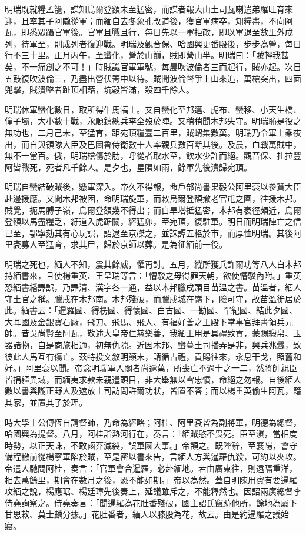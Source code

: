 \begin{pinyinscope}
明瑞既就糧孟籠，諜知烏爾登額未至猛密，而諜者報大山土司瓦喇遣弟羅旺育來迎，且率其子阿隴從軍；而緬自去冬象孔改道後，獲官軍病卒，知糧盡，不向阿瓦，即悉眾躡官軍後。官軍且戰且行，每日先以一軍拒敵，即以軍退至數里外成列，待軍至，則成列者復迎戰。明瑞及觀音保、哈國興更番殿後，步步為營，每日行不三十里。正月丙午，至蠻化，營於山巔，賊即營山半。明瑞曰：「賊輕我甚矣，不一痛創之不可！」時賊識官軍軍號，每晨吹波倫者三而起行，賊亦起。次日五鼓復吹波倫三，乃盡出營伏箐中以待。賊聞波倫聲爭上山來追，萬槍突出，四面兜擊，賊潰墜者趾頂相藉，坑穀皆滿，殺四千餘人。

明瑞休軍蠻化數日，取所得牛馬犒士。又自蠻化至邦邁、虎布、蠻移、小天生橋、僮子壩，大小數十戰，永順鎮總兵李全歿於陣。又稍稍聞木邦失守。明瑞恥是役之無功也，二月己未，至猛育，距宛頂糧臺二百里，賊蝟集數萬。明瑞乃令軍士乘夜出，而自與領隊大臣及巴圖魯侍衛數十人率親兵數百斷其後。及晨，血戰萬賊中，無不一當百。俄，明瑞槍傷於肋，呼從者取水至，飲水少許而絕。觀音保、扎拉豐阿皆戰死，死者凡千餘人。是夕也，星隕如雨，餘軍先後潰歸宛頂。

明瑞自蠻結破賊後，懸軍深入。帝久不得報，命戶部尚書果毅公阿里袞以參贊大臣赴邊援應。又聞木邦被困，命明瑞旋軍，而敕烏爾登額撤老官屯之圍，往援木邦。賊覺，扼馬膊子嶺，烏爾登額幾不得出；而自旱塔抵猛密，木邦有袤徑頗近，烏爾登額以馬盡糧乏，紆道入虎踞關，經猛卯，至宛頂，復駐軍。明日而明瑞陣亡之信已至，鄂寧劾其有心玩誤，詔逮至京磔之，並誅譚五格於市，而厚恤明瑞。其後阿里袞募人至猛育，求其尸，歸於京師以葬。是為征緬前一役。

明瑞之死也，緬人不知，震其餘威，懼再討。五月，縱所獲兵許爾功等八人自木邦持緬書來，且使楊重英、王呈瑞等言：「懵駁之母得罪天朝，欲使懵駁內附。」重英恐緬書繙譯誤，乃譯清、漢字各一通，益以木邦臘戌頭目苗溫之書。苗溫者，緬人守土官之稱。臘戌在木邦南。木邦殘破，而臘戍城在嶺下，險可守，故苗溫徙居於此。緬書云：「暹羅國、得楞國、得懷國、白古國、一勘國、罕紀國、結此夕國、大耳國及金銀寶石廠，飛刀、飛馬、飛人、有福好善之王殿下掌事官拜書領兵元帥。昔吳尚賢至阿瓦，敬述大皇帝仁慈樂善，我緬王用是具禮致貢，蒙賜緞帛、玉器諸物，自是商旅相通，初無仇隙。近因木邦、蠻暮土司播弄是非，興兵兆釁，致彼此人馬互有傷亡。茲特投文敘明顛末，請循古禮，貢賜往來，永息干戈，照舊和好。」阿里袞以聞。帝念明瑞軍入關者尚逾萬，所喪亡不過十之一二，然將帥親臣皆捐軀異域，而緬夷求款未親遣頭目，非大舉無以雪忠憤，命絕之勿報。自後緬人數以書與隴正野人及遮放土司訪問許爾功狀，皆置不答；而以楊重英偷生阿瓦，籍其家，並置其子於理。

時大學士公傅恆自請督師，乃命為經略；阿桂、阿里袞皆為副將軍，明德為總督，哈國興為提督。八月，阿桂詣熱河行在，奏言：「緬賊愍不畏死。臣至滇，當相度時勢，以正天誅，不敢鹵莽滅裂，誤軍國大事。」帝頷之。既陛辭，至襄陽，會守備程轍前從楊寧軍陷於賊，至是密以書來告，言緬人方與暹羅仇殺，可約以夾攻。帝遣人馳問阿桂，奏言：「官軍會合暹羅，必赴緬地。若由廣東往，則遠隔重洋，相去萬餘里，期會在數月之後，恐不能如期。」帝以為然。蓋自明陳用賓有要暹羅攻緬之說，楊應琚、楊廷璋先後奏上，延議雖斥之，不能釋然也。因詔兩廣總督李侍堯詢察之。侍堯奏言：「聞暹羅為花肚番殘破，國主詔氏竄跡他所，餘地為屬下甘恩敕、莫士麟分據。」花肚番者，緬人以膝股為花，故云。由是約暹羅之議始寢。


\end{pinyinscope}
